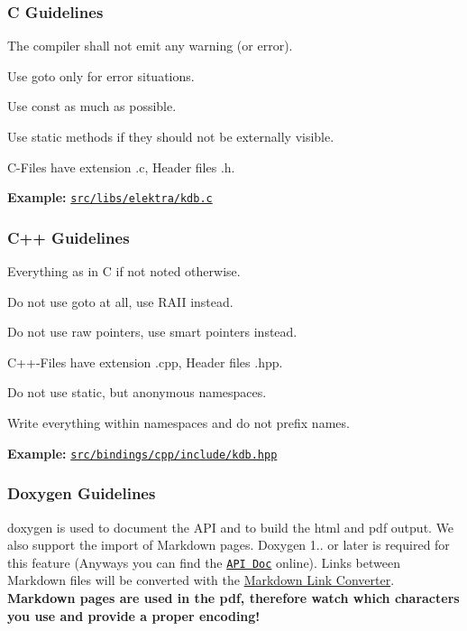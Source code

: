 \subsubsection*{C Guidelines}


\begin{DoxyItemize}
\item The compiler shall not emit any warning (or error).
\item Use goto only for error situations.
\item Use {\ttfamily const} as much as possible.
\item Use {\ttfamily static} methods if they should not be externally visible.
\item C-\/\+Files have extension {\ttfamily .c}, Header files {\ttfamily .h}.
\end{DoxyItemize}

{\bfseries Example\+:} \href{/home/markus/Projekte/Elektra/current/src/libs/elektra/kdb.c}{\tt src/libs/elektra/kdb.\+c}

\subsubsection*{C++ Guidelines}


\begin{DoxyItemize}
\item Everything as in C if not noted otherwise.
\item Do not use goto at all, use R\+A\+I\+I instead.
\item Do not use raw pointers, use smart pointers instead.
\item C++-\/\+Files have extension {\ttfamily .cpp}, Header files {\ttfamily .hpp}.
\item Do not use {\ttfamily static}, but anonymous namespaces.
\item Write everything within namespaces and do not prefix names.
\end{DoxyItemize}

{\bfseries Example\+:} \href{http://libelektra.org/tree/master/src/bindings/cpp/include/kdb.hpp}{\tt src/bindings/cpp/include/kdb.\+hpp}

\subsubsection*{Doxygen Guidelines}

{\ttfamily doxygen} is used to document the A\+P\+I and to build the html and pdf output. We also support the import of Markdown pages. Doxygen 1.. or later is required for this feature (Anyways you can find the \href{http://doc.libelektra.org/api/latest/html/}{\tt A\+P\+I Doc} online). Links between Markdown files will be converted with the \hyperlink{doc_markdownlinkconverter_README_md}{Markdown Link Converter}. {\bfseries Markdown pages are used in the pdf, therefore watch which characters you use and provide a proper encoding!}


